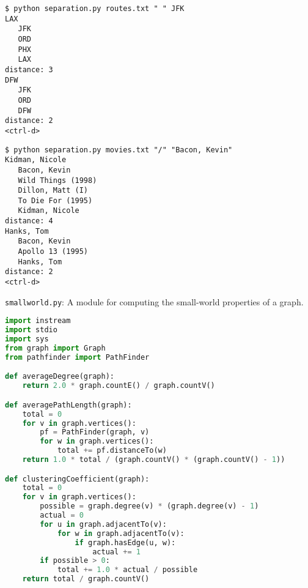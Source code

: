 \documentclass[8pt,a4paper,compress,handout]{beamer}
\begin{document}
\begin{frame}[fragile]
\begin{lstlisting}[language={}]
$ python separation.py routes.txt " " JFK
LAX   
   JFK
   ORD
   PHX
   LAX
distance: 3
DFW
   JFK
   ORD
   DFW
distance: 2
<ctrl-d>
\end{lstlisting}

\begin{lstlisting}[language={}]
$ python separation.py movies.txt "/" "Bacon, Kevin"
Kidman, Nicole
   Bacon, Kevin
   Wild Things (1998)
   Dillon, Matt (I)
   To Die For (1995)
   Kidman, Nicole
distance: 4
Hanks, Tom
   Bacon, Kevin
   Apollo 13 (1995)
   Hanks, Tom
distance: 2
<ctrl-d>
\end{lstlisting}
\end{frame}

\begin{frame}[fragile]
\begin{framed}
\tiny \lstinline{smallworld.py}: A module for computing the small-world properties of a graph.
\end{framed}

\begin{lstlisting}[language=Python]
import instream
import stdio
import sys
from graph import Graph
from pathfinder import PathFinder

def averageDegree(graph):
    return 2.0 * graph.countE() / graph.countV()

def averagePathLength(graph):
    total = 0
    for v in graph.vertices():
        pf = PathFinder(graph, v)
        for w in graph.vertices():
            total += pf.distanceTo(w)
    return 1.0 * total / (graph.countV() * (graph.countV() - 1))

def clusteringCoefficient(graph):
    total = 0
    for v in graph.vertices():
        possible = graph.degree(v) * (graph.degree(v) - 1)
        actual = 0
        for u in graph.adjacentTo(v):
            for w in graph.adjacentTo(v):
                if graph.hasEdge(u, w):
                    actual += 1
        if possible > 0:
            total += 1.0 * actual / possible
    return total / graph.countV()
\end{lstlisting}
\end{frame}
\end{document}
